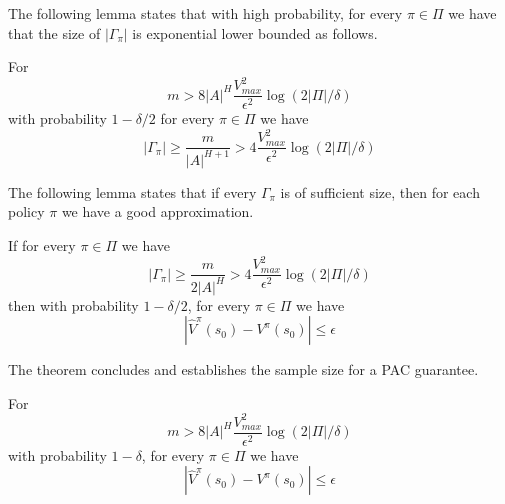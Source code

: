 The following lemma states that with high probability, for every
$\pi\in \Pi$ we have that the size of $|\Gamma_\pi|$ is exponential lower bounded as follows.
\begin{lemma}
For
\[
m> 8|A|^{H}\frac{V^2_{max}}{\epsilon^2}\log(2|\Pi|/\delta)
\]
with probability $1-\delta/2$ for every $\pi\in \Pi$ we have
\[
|\Gamma_\pi|\geq \frac{m}{|A|^{H+1}}>
4\frac{V^2_{max}}{\epsilon^2}\log(2|\Pi|/\delta)
\]
\end{lemma}

The following lemma states that if every $\Gamma_\pi$ is of
sufficient size, then for each policy $\pi$ we have a good
approximation.
\begin{lemma}
If for every $\pi\in \Pi$ we have
\[
|\Gamma_\pi|\geq \frac{m}{2|A|^{H}}> 4
\frac{V^2_{max}}{\epsilon^2}\log(2|\Pi|/\delta)
\]
then with probability $1-\delta/2$, for every $\pi\in \Pi$ we have
\[
|\hat{V}^\pi (s_0)-V^\pi(s_0)|\leq \epsilon
\]
\end{lemma}


The theorem concludes and establishes the sample size for a PAC
guarantee.
\begin{theorem}
For
\[
m> 8|A|^{H}\frac{V^2_{max}}{\epsilon^2}\log(2|\Pi|/\delta)
\]
with probability $1-\delta$, for every $\pi\in \Pi$ we have
\[
|\hat{V}^\pi (s_0)-V^\pi(s_0)|\leq \epsilon
\]
\end{theorem}



















%
